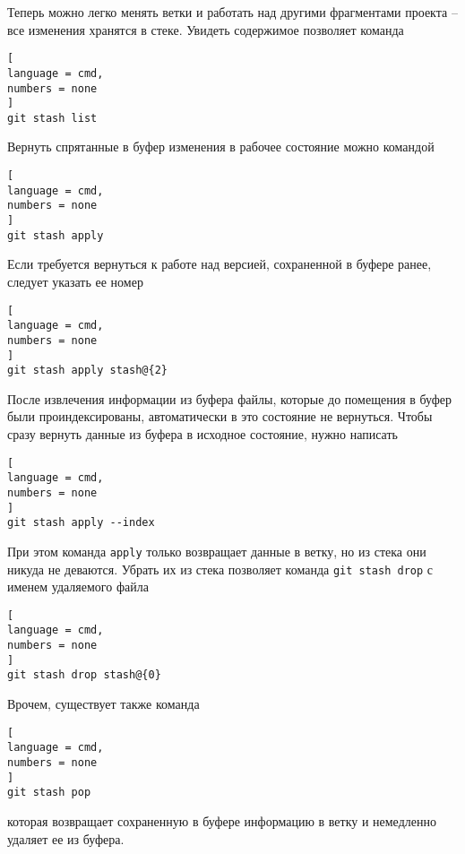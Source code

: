 \documentclass[%
	11pt,
	a4paper,
	utf8,
		]{article}
\begin{document}

Теперь можно легко менять ветки и работать над другими фрагментами проекта -- все изменения хранятся в стеке. Увидеть содержимое позволяет команда

\begin{lstlisting}[
language = cmd,
numbers = none
]
git stash list
\end{lstlisting}

Вернуть спрятанные в буфер изменения в рабочее состояние можно командой

\begin{lstlisting}[
language = cmd,
numbers = none
]
git stash apply
\end{lstlisting}

Если требуется вернуться к работе над версией, сохраненной в буфере ранее, следует указать ее номер

\begin{lstlisting}[
language = cmd,
numbers = none
]
git stash apply stash@{2}
\end{lstlisting}


После извлечения информации из буфера файлы, которые до помещения в буфер были проиндексированы, автоматически в это состояние не вернуться. Чтобы сразу вернуть данные из буфера в исходное состояние, нужно написать

\begin{lstlisting}[
language = cmd,
numbers = none
]
git stash apply --index
\end{lstlisting}

При этом команда \texttt{apply} только возвращает данные в ветку, но из стека они никуда не деваются. Убрать их из стека позволяет команда \texttt{git stash drop} с именем удаляемого файла

\begin{lstlisting}[
language = cmd,
numbers = none
]
git stash drop stash@{0}
\end{lstlisting}


Врочем, существует также команда
\begin{lstlisting}[
language = cmd,
numbers = none
]
git stash pop
\end{lstlisting}
которая возвращает сохраненную в буфере информацию в ветку и немедленно удаляет ее из буфера.
\end{document}
